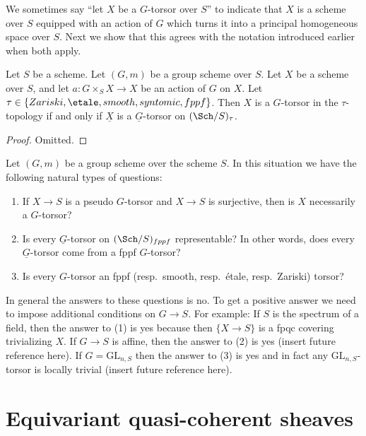 \noindent
We sometimes say ``let $X$ be a $G$-torsor over $S$'' to indicate that
$X$ is a scheme over $S$ equipped with an action of $G$ which turns it
into a principal homogeneous space over $S$.
Next we show that this agrees with the notation introduced earlier
when both apply.

\begin{lemma}
\label{lemma-torsor}
Let $S$ be a scheme.
Let $(G, m)$ be a group scheme over $S$.
Let $X$ be a scheme over $S$, and let
$a : G \times_S X \to X$ be an action of $G$ on $X$.
Let $\tau \in \{Zariski, \etale, smooth, syntomic, fppf\}$.
Then $X$ is a $G$-torsor in the $\tau$-topology if and only if
$\underline{X}$ is a $\underline{G}$-torsor on $(\Sch/S)_\tau$.
\end{lemma}

\begin{proof}
Omitted.
\end{proof}

\begin{remark}
\label{remark-fun-with-torsors}
Let $(G, m)$ be a group scheme over the scheme $S$.
In this situation we have the following natural types of questions:
\begin{enumerate}
\item If $X \to S$ is a pseudo $G$-torsor and $X \to S$ is surjective,
then is $X$ necessarily a $G$-torsor?
\item Is every $\underline{G}$-torsor on $(\Sch/S)_{fppf}$
representable? In other words, does every $\underline{G}$-torsor
come from a fppf $G$-torsor?
\item Is every $G$-torsor an
fppf (resp.\ smooth, resp.\ \'etale, resp.\ Zariski) torsor?
\end{enumerate}
In general the answers to these questions is no. To get a positive answer
we need to impose additional conditions on $G \to S$.
For example:
If $S$ is the spectrum of a field, then the answer to (1) is yes
because then $\{X \to S\}$ is a fpqc covering trivializing $X$.
If $G \to S$ is affine, then the answer to (2) is yes
(insert future reference here).
If $G = \text{GL}_{n, S}$ then the answer to (3) is yes
and in fact any $\text{GL}_{n, S}$-torsor is locally trivial
(insert future reference here).
\end{remark}



\section{Equivariant quasi-coherent sheaves}
\label{section-equivariant}


